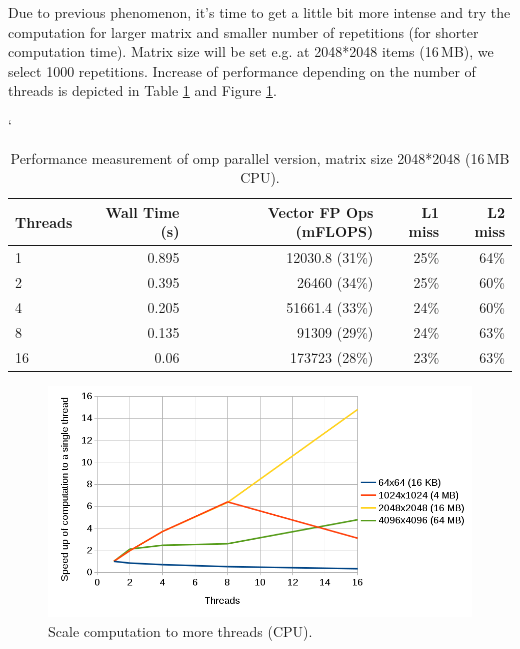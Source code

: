 \par Due to previous phenomenon, it's time to get a little bit more intense and try the computation for larger matrix and smaller number of repetitions (for shorter computation time). Matrix size will be set e.g. at 2048*2048 items (16\,MB), we select 1000 repetitions.  Increase of performance depending on the number of threads is depicted in Table \ref{tab:table_matvec_2048_scaling} and Figure \ref{fig:graph_matvec_2048_scaling}.

\begin{table}[ht]
\catcode`
\begin{center}
\begin{tabular}{| l | r | r | r | r |} \hline
\textbf{Threads} & \textbf{Wall Time (s)} & \textbf{Vector FP Ops (mFLOPS)} & L1 miss & L2 miss\\ \hline
1 & 0.895 & 12030.8 (31\%) & 25\% & 64\%\\ \hline
2 & 0.395 & 26460 (34\%) & 25\% & 60\%\\ \hline
4 & 0.205 & 51661.4 (33\%) & 24\% & 60\%\\ \hline
8 & 0.135 & 91309 (29\%) & 24\% & 63\%\\ \hline
16 & 0.06 & 173723 (28\%) & 23\% & 63\%\\ \hline
\end{tabular}
\caption{Performance measurement of omp parallel version, matrix size 2048*2048 (16\,MB CPU).}
\label{tab:table_matvec_2048_scaling}
\end{center}
\end{table}

\begin{figure}[htbp]
    \centering
    \includegraphics[width=1\linewidth]{fig/matvec_scaling.png}
    \caption{Scale computation to more threads (CPU).}
    \label{fig:graph_matvec_2048_scaling}
\end{figure} 

